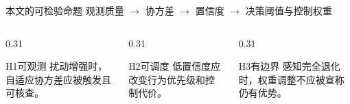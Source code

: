\begin{frame}{本文的可检验命题}
  \centering
  \vspace{3mm}
  {\Large
    观测质量
    \(\longrightarrow\)
    协方差
    \(\longrightarrow\)
    置信度
    \(\longrightarrow\)
    决策阈值与控制权重
  }

  \vspace{8mm}
  \begin{columns}[T,onlytextwidth]
    \begin{column}{0.31\textwidth}
      \begin{block}{H1\quad 可观测}
        扰动增强时，自适应协方差应被触发且可核查。
      \end{block}
    \end{column}
    \begin{column}{0.31\textwidth}
      \begin{block}{H2\quad 可调度}
        低置信度应改变行为优先级和控制代价。
      \end{block}
    \end{column}
    \begin{column}{0.31\textwidth}
      \begin{block}{H3\quad 有边界}
        感知完全退化时，权重调整不应被宣称仍有优势。
      \end{block}
    \end{column}
  \end{columns}

\end{frame}
